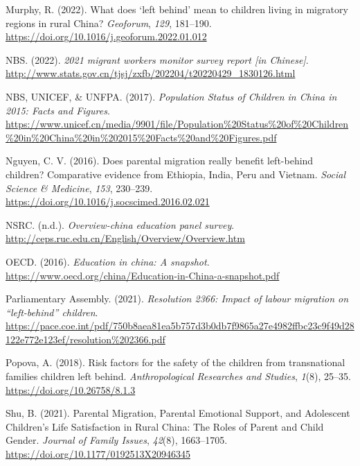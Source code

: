 \documentclass[
  man,floatsintext]{apa7}
\newlength{\cslhangindent}
\newlength{\cslentryspacingunit} %
\newenvironment{CSLReferences}[2] %
 {%
  \setlength{\parindent}{0pt}
  \ifodd #1
  \let\oldpar\par
  \def\par{\hangindent=\cslhangindent\oldpar}
  \fi
  \setlength{\parskip}{#2\cslentryspacingunit}
 }%
 {}
\begin{document}
\begin{CSLReferences}{1}{0}
\leavevmode{}%
Murphy, R. (2022). What does {`}left behind{'} mean to children living in migratory regions in rural China? \emph{Geoforum}, \emph{129}, 181--190. \url{https://doi.org/10.1016/j.geoforum.2022.01.012}

\leavevmode{}%
NBS. (2022). \emph{2021 migrant workers monitor survey report {[}in Chinese{]}}. \url{http://www.stats.gov.cn/tjsj/zxfb/202204/t20220429_1830126.html}

\leavevmode{}%
NBS, UNICEF, \& UNFPA. (2017). \emph{Population Status of Children in China in 2015: Facts and Figures}. \url{https://www.unicef.cn/media/9901/file/Population\%20Status\%20of\%20Children\%20in\%20China\%20in\%202015\%20Facts\%20and\%20Figures.pdf}

\leavevmode{}%
Nguyen, C. V. (2016). Does parental migration really benefit left-behind children? Comparative evidence from Ethiopia, India, Peru and Vietnam. \emph{Social Science \& Medicine}, \emph{153}, 230--239. \url{https://doi.org/10.1016/j.socscimed.2016.02.021}

\leavevmode{}%
NSRC. (n.d.). \emph{Overview-china education panel survey}. \url{http://ceps.ruc.edu.cn/English/Overview/Overview.htm}

\leavevmode{}%
OECD. (2016). \emph{Education in china: A snapshot}. \url{https://www.oecd.org/china/Education-in-China-a-snapshot.pdf}

\leavevmode{}%
Parliamentary Assembly. (2021). \emph{Resolution 2366: Impact of labour migration on {``}left-behind{''} children}. \url{https://pace.coe.int/pdf/750b8aea81ea5b757d3b0db7f9865a27e4982ffbc23c9f49d28122e772e123ef/resolution\%202366.pdf}

\leavevmode{}%
Popova, A. (2018). Risk factors for the safety of the children from transnational families children left behind. \emph{Anthropological Researches and Studies}, \emph{1}(8), 25--35. \url{https://doi.org/10.26758/8.1.3}

\leavevmode{}%
Shu, B. (2021). Parental Migration, Parental Emotional Support, and Adolescent Children{'}s Life Satisfaction in Rural China: The Roles of Parent and Child Gender. \emph{Journal of Family Issues}, \emph{42}(8), 1663--1705. \url{https://doi.org/10.1177/0192513X20946345}


\end{CSLReferences}
\end{document}
